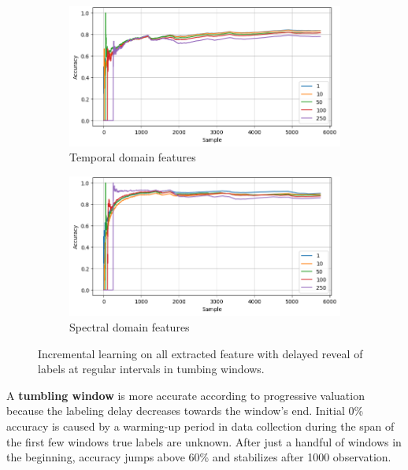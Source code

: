 \begin{figure}[ht]
    \centering
    \begin{subfigure}[b]{0.49\textwidth}
        \includegraphics[width=\textwidth]{assets/design/gradual-learning-delay-temporal-domain-fault.png}
        \caption{Temporal domain features}
    \end{subfigure}
    \hfill
    \begin{subfigure}[b]{0.49\textwidth}
        \includegraphics[width=\textwidth]{assets/design/gradual-learning-delay-spectral-domain-fault.png}
        \caption{Spectral domain features}
    \end{subfigure}
    \caption{Incremental learning on all extracted feature with delayed reveal of labels at regular intervals in tumbing windows.}
    \label{fig:design:online-fault-delay-tumbling}
\end{figure}

A \textbf{tumbling window} is more accurate according to progressive valuation because the labeling delay decreases towards the window's end. Initial 0\% accuracy is caused by a warming-up period in data collection during the span of the first few windows true labels are unknown. After just a handful of windows in the beginning, accuracy jumps above 60\% and stabilizes after 1000 observation.

